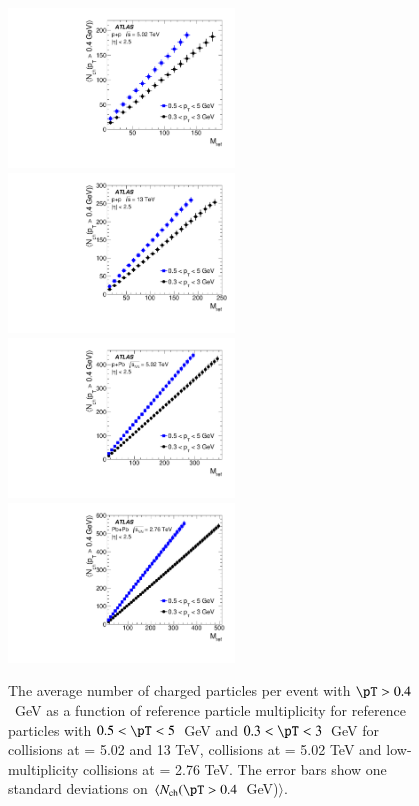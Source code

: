 \documentclass[cernpreprint,texlive=2014,txfonts,UKenglish]{latex/atlasdoc}
\begin{document}
\begin{figure}[ht!]
\begin{center}
\includegraphics[width=60mm]{fig_02a.pdf}
\includegraphics[width=60mm]{fig_02b.pdf}
\includegraphics[width=60mm]{fig_02c.pdf}
\includegraphics[width=60mm]{fig_02d.pdf}
\caption{ The average number of charged particles per event with $\pT >0.4$~GeV  as a function of reference particle multiplicity for reference particles with $ 0.5 < \pT <5$~GeV  and $ 0.3 < \pT <3$~GeV  for \pp collisions at \sqs= 5.02 and 13 TeV, \pPb collisions at \sqn= 5.02 TeV and low-multiplicity \PbPb collisions at \sqn= 2.76 TeV. The error bars show one standard deviations on $\langle N_{\mathrm{ch}}(\pT > 0.4$~GeV)$\rangle$. }
\label{fig:CorrNtrk} 
\end{center}
\end{figure}  
\end{document}
